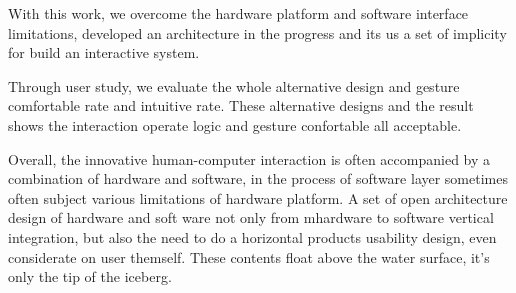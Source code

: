 With this work, we overcome the hardware platform and software interface limitations, developed an architecture in the progress and its us a set of implicity for build an interactive system.


Through user study, we evaluate the whole alternative design and gesture comfortable rate and intuitive rate. These alternative designs and the result shows the interaction operate logic and gesture confortable all acceptable.


Overall, the innovative human-computer interaction is often accompanied by a combination of hardware and software, in the process of software layer sometimes often subject various limitations of hardware platform. A set of open architecture design of hardware and soft ware not only from mhardware to software vertical integration, but also the need to do a horizontal products  usability design, even considerate on user themself. These contents float above the water surface, it's only the tip of the iceberg.

\cleardoublepage
